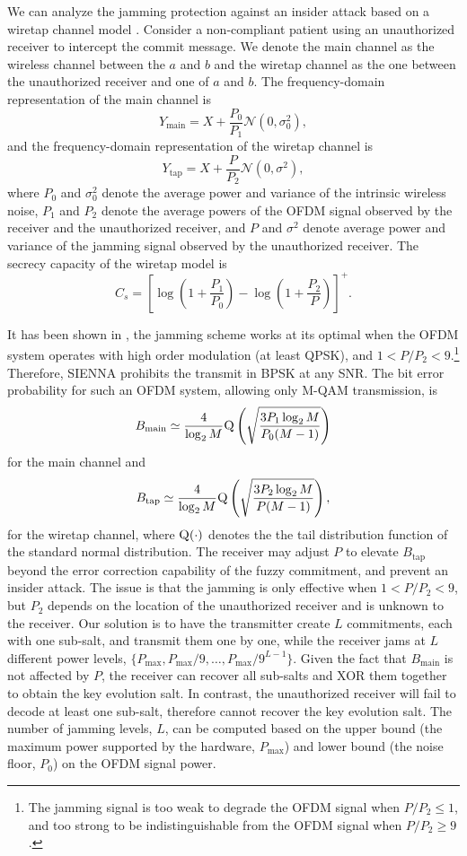 We can analyze the jamming protection against an insider attack based on a wiretap channel model \cite{LiangCompoundWiretapChannels2009}. Consider a non-compliant patient using an unauthorized receiver to intercept the commit message. We denote the main channel as the wireless channel between the $a$ and $b$ and the wiretap channel as the one between the unauthorized receiver and one of $a$ and $b$. The frequency-domain representation of the main channel is
\[
Y_{\text{main}} = X + \frac{P_0}{P_1}\mathcal{N}(0, \sigma^2_0),
\]
and the frequency-domain representation of the wiretap channel is
\[
Y_{\text{tap}} = X + \frac{P}{P_2}\mathcal{N}(0, \sigma^2),
\]
where $P_0$ and $\sigma^2_0$ denote the average power and variance of the intrinsic wireless noise, $P_1$ and $P_2$ denote the average powers of the OFDM signal observed by the receiver and the unauthorized receiver, and $P$ and $\sigma^2$ denote average power and variance of the jamming signal observed by the unauthorized receiver. The secrecy capacity \cite{WynerWiretapChannel1975} of the wiretap model is
\[
C_s = \left[\log\left(1 + \frac{P_1}{P_0}\right) - \log\left(1 + \frac{P_2}{P}\right)\right]^{+}.
\]

It has been shown in \cite{GollakotaPhysicalLayerWireless2011}, the jamming scheme works at its optimal when the OFDM system operates with high order modulation (at least QPSK), and $1 < P/P_2 < 9$.\footnote{The jamming signal is too weak to degrade the OFDM signal when $P/P_2 \leq 1$, and too strong to be indistinguishable from the OFDM signal when  $P/P_2 \ge 9$.} Therefore, SIENNA prohibits the transmit in BPSK at any SNR. The bit error probability for such an OFDM system, allowing only M-QAM transmission, is 
\[
B_{\text{main}} \simeq \frac{4}{\log_2{M}}\textsc{Q}\left( \sqrt{\frac{3 P_1 \log_2{M}}{P_0(M-1)}} \right)
\]
for the main channel and 
\[
B_{\text{tap}} \simeq \frac{4}{\log_2{M}}\textsc{Q}\left( \sqrt{\frac{3 P_2 \log_2{M}}{P(M-1)}} \right),
\]
for the wiretap channel, where $\textsc{Q}(\cdot)$ denotes the the tail distribution function of the standard normal distribution. The receiver may adjust $P$ to elevate $B_{\text{tap}}$ beyond the error correction capability of the fuzzy commitment, and prevent an insider attack. The issue is that the jamming is only effective when $1 < P/P_2 < 9$, but $P_2$ depends on the location of the unauthorized receiver and is unknown to the receiver. Our solution is to have the transmitter create $L$ commitments, each with one sub-salt, and transmit them one by one, while the receiver jams at $L$ different power levels, $\{P_{\text{max}}, P_{\text{max}}/9, \ldots, P_{\text{max}}/9^{L-1}\}$. Given the fact that $B_{\text{main}}$ is not affected by $P$, the receiver can recover all sub-salts and XOR them together to obtain the key evolution salt. In contrast, the unauthorized receiver will fail to decode at least one sub-salt, therefore cannot recover the key evolution salt. The number of jamming levels, $L$, can be computed based on the upper bound (the maximum power supported by the hardware, $P_{\text{max}}$) and lower bound (the noise floor, $P_0$) on the OFDM signal power. 